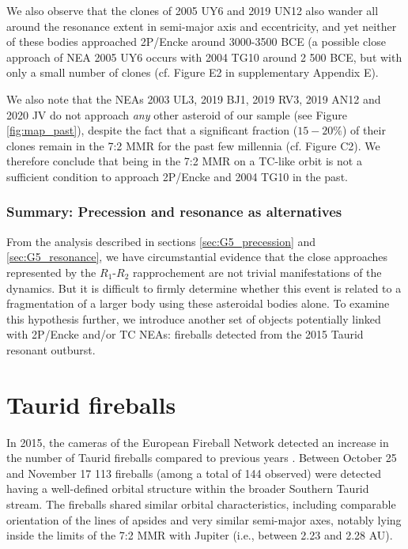 \documentclass[letters,a4paper,fleqn,usenatbib]{mnras}
\begin{document}
 We also observe that the clones of 2005 UY6 and 2019 UN12 also wander all around the resonance extent in semi-major axis and eccentricity, and yet neither of these bodies approached 2P/Encke around 3000-3500 BCE (a possible close approach of NEA 2005 UY6 occurs with 2004 TG10 around 2 500 BCE, but with only a small number of clones (cf. Figure E2 in supplementary Appendix E). 
 
 We also note that the NEAs 2003 UL3, 2019 BJ1, 2019 RV3, 2019 AN12 and 2020 JV do not approach {\it any} other asteroid of our sample (see Figure \ref{fig:map_past}), despite the fact that a significant fraction ($15-20\%$) of their clones remain in the 7:2 MMR for the past few millennia (cf. Figure C2). We therefore conclude that being in the 7:2 MMR on a TC-like orbit is not a sufficient condition to approach 2P/Encke and 2004 TG10 in the past.
 
\subsubsection{Summary: Precession and resonance as alternatives} 

From the analysis described in sections \ref{sec:G5_precession} and \ref{sec:G5_resonance}, we have circumstantial evidence that the close approaches represented by the $R_1$-$R_2$ rapprochement are not trivial manifestations of the dynamics. But it is difficult to firmly determine whether this event is related to a fragmentation of a larger body using these asteroidal bodies alone. To examine this hypothesis further, we introduce another set of objects potentially linked with 2P/Encke and/or TC NEAs: fireballs detected from the 2015 Taurid resonant outburst. 
 
 \section{Taurid fireballs} \label{sec:fireballs}
 
 In 2015, the cameras of the European Fireball Network detected an increase in the number of Taurid fireballs compared to previous years \citep{Spurny2017}. Between October 25 and November 17 113 fireballs (among a total of 144 observed) were detected having a well-defined orbital structure within the broader Southern Taurid stream. The fireballs shared similar orbital characteristics, including comparable orientation of the lines of apsides and very similar semi-major axes, notably lying inside the limits of the 7:2 MMR  with Jupiter (i.e., between 2.23 and 2.28 AU).
 
\end{document}

